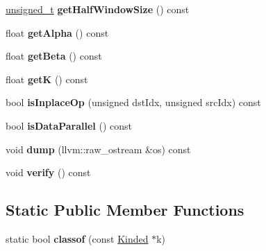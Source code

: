 \begin{DoxyCompactItemize}
\item 
\mbox{\label{classglow_1_1_local_response_normalization_grad_inst_a450609fe27a23b880f2e6c5301ed9bb7}} 
\hyperlink{namespaceglow_a0ca574644e1e42ef193a9947fb4d8911}{unsigned\+\_\+t} {\bfseries get\+Half\+Window\+Size} () const
\item 
\mbox{\label{classglow_1_1_local_response_normalization_grad_inst_a84d520b6f113462cb14c457e7e4175fc}} 
float {\bfseries get\+Alpha} () const
\item 
\mbox{\label{classglow_1_1_local_response_normalization_grad_inst_ab0904e8a86ad6af825afd6fc99c3ac2a}} 
float {\bfseries get\+Beta} () const
\item 
\mbox{\label{classglow_1_1_local_response_normalization_grad_inst_adb5393149503c28c1b1501e35c9de190}} 
float {\bfseries getK} () const
\item 
\mbox{\label{classglow_1_1_local_response_normalization_grad_inst_af398474b73002ff3e169da3a7296c2e0}} 
bool {\bfseries is\+Inplace\+Op} (unsigned dst\+Idx, unsigned src\+Idx) const
\item 
\mbox{\label{classglow_1_1_local_response_normalization_grad_inst_acc2ada50493a6cd246fb51dc8e6cc5e1}} 
bool {\bfseries is\+Data\+Parallel} () const
\item 
\mbox{\label{classglow_1_1_local_response_normalization_grad_inst_ad3c408e10772b915a8a7df217ae093a5}} 
void {\bfseries dump} (llvm\+::raw\+\_\+ostream \&os) const
\item 
\mbox{\label{classglow_1_1_local_response_normalization_grad_inst_ab1e337e597dc95de54c215f76d8ea5ee}} 
void {\bfseries verify} () const
\end{DoxyCompactItemize}
\subsection*{Static Public Member Functions}
\begin{DoxyCompactItemize}
\item 
\mbox{\label{classglow_1_1_local_response_normalization_grad_inst_a71f094c8cc093cc9a240e60a4fc41694}} 
static bool {\bfseries classof} (const \hyperlink{classglow_1_1_kinded}{Kinded} $\ast$k)
\end{DoxyCompactItemize}
